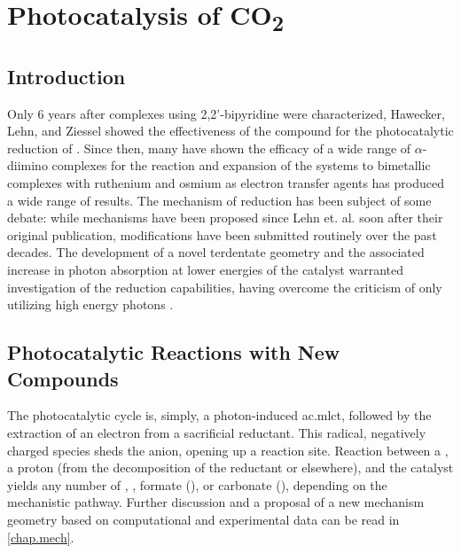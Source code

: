 \chapter{Photocatalysis of \texorpdfstring{CO\textsubscript{2}}{CO2}}\label{chap.co2}

\section{Introduction}

Only 6 years after  complexes using 2,2'-bipyridine were characterized, Hawecker, Lehn, and Ziessel showed the effectiveness of the compound for the photocatalytic reduction of \autocite{hawecker1983}. Since then, many have shown the efficacy of a wide range of $\alpha$-diimino complexes for the reaction\autocite{hawecker1986, kurz2006, portenkirchner2014} and expansion of the systems to bimetallic complexes with ruthenium and osmium as electron transfer agents has produced a wide range of results\autocite{rossenaar1996, takeda2008, tamaki2013}. The mechanism of reduction has been subject of some debate: while mechanisms have been proposed since Lehn et. al. soon after their original publication\autocite{hawecker1986}, modifications have been submitted routinely over the past decades\autocite{hayashi2003, morris2009, takeda2008, grills2010, agarwal2011, agarwal2012a, agarwal2012b, keith2013}. The development of a novel terdentate geometry and the associated increase in photon absorption at lower energies of the catalyst warranted investigation of the  reduction capabilities, having overcome the criticism of only utilizing high energy photons \autocite{kutal1985}. 

\section{Photocatalytic Reactions with New Compounds}

The photocatalytic cycle is, simply, a photon-induced \gls{ac.mlct}, followed by the extraction of an electron from a sacrificial reductant. This radical, negatively charged species sheds the anion, opening up a reaction site. Reaction between a , a proton (from the decomposition of the reductant or elsewhere), and the catalyst yields any number of , , formate (), or carbonate (), depending on the mechanistic pathway. Further discussion and a proposal of a new mechanism geometry based on computational and experimental data can be read in \autoref{chap.mech}.

